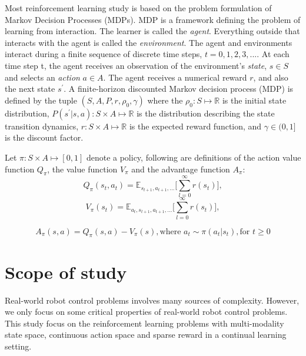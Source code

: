 Most reinforcement learning study is based on the problem formulation of Markov Decision Processes (MDPs). MDP is a framework defining the problem of learning from interaction. The learner is called the \textit{agent}. Everything outside that interacts with the agent is called the \textit{environment}.
The agent and environments interact during a finite sequence of discrete time steps, $t=0,1,2,3,...$. At each time step t, the agent receives an observation of the environment's \textit{state}, $s \in S$ and selects an \textit{action} $a \in A$. The agent receives a numerical reward $r$, and also the next state $s^\prime$.  A finite-horizon discounted Markov decision process (MDP) is defined by the tuple $(S,A,P,r,\rho_0,\gamma) $ where the $\rho_0 : S \mapsto \mathbb{R}$ is the initial state distribution, $P(s^\prime|s,a) : S \times A \mapsto \mathbb{R}$ is the distribution describing the state transition dynamics, $r : S \times A \mapsto \mathbb{R}$ is the expected reward function, and $\gamma \in (0,1]$ is the discount factor.

Let $\pi : S \times A \mapsto [0,1] $ denote a policy, following are definitions of the action value function $Q_\pi $, the value function $V_\pi $ and the advantage function $A_\pi $:
$$ Q_\pi(s_t,a_t) = \mathbb{E}_{s_{t+1},a_{t+1},\ldots}
\big[ \sum_{l=0}^\infty r(s_{t}) \big],$$
$$ V_\pi(s_t) = \mathbb{E}_{a_{t},s_{t+1},a_{t+1},\ldots}
\big[ \sum_{l=0}^\infty r(s_{t}) \big],$$

$$ A_\pi (s,a) = Q_\pi (s,a) - V_\pi (s), \text{where } a_t \sim \pi (a_t|s_t), \text{for } t \geq 0 $$




\section{Scope of study}
Real-world robot control problems involves many sources of complexity. However, we only focus on some critical properties of real-world robot control problems.
This study focus on the reinforcement learning problems with multi-modality state space, continuous action space and sparse reward in a continual learning setting.

